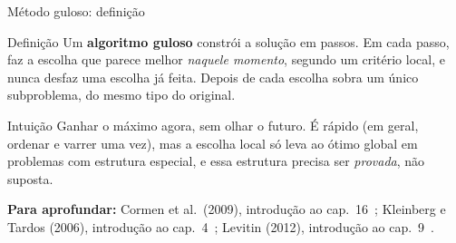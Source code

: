 \documentclass[aspectratio=169,xcolor=table]{beamer}
\newcommand{\fonte}[1]{%
  \vfill
  {\tiny\color{gray!55!black}\textbf{Para aprofundar:} #1\par}%
}
\begin{document}
\begin{frame}{Método guloso: definição}
  \begin{block}{Definição}
    Um \textbf{algoritmo guloso} constrói a solução em passos. Em cada passo, faz a escolha que
    parece melhor \emph{naquele momento}, segundo um critério local, e nunca desfaz uma escolha
    já feita. Depois de cada escolha sobra um único subproblema, do mesmo tipo do original.
  \end{block}
  \begin{exampleblock}{Intuição}
    Ganhar o máximo agora, sem olhar o futuro. É rápido (em geral, ordenar e varrer uma vez),
    mas a escolha local só leva ao ótimo global em problemas com estrutura especial, e essa
    estrutura precisa ser \emph{provada}, não suposta.
  \end{exampleblock}
  \fonte{Cormen et al.\ (2009), introdução ao cap.~16~\cite{cormen2009introduction};
    Kleinberg e Tardos (2006), introdução ao cap.~4~\cite{kleinberg2006algorithm};
    Levitin (2012), introdução ao cap.~9~\cite{levitin2012introduction}.}
\end{frame}
\end{document}
